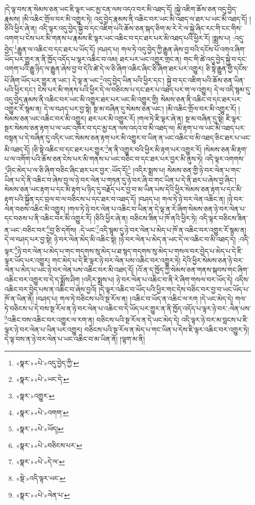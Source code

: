 །དེ་ལྟ་བས་ན་སེམས་ཅན་ཡང་ཇི་ལྟར་ཡང་མྱ་ངན་ལས་འདའ་བར་མི་འཐད་དོ། །སྐྱེ་འཇིག་ཆོས་ཅན་འདུ་བྱེད་རྣམས། །མི་འཆིང་གྲོལ་བར་མི་འགྱུར་ཏེ། འདུ་བྱེད་རྣམས་ནི་འཆིང་བར་ཡང་མི་འཐད་ལ་ཐར་པ་ཡང་མི་འཐད་དོ། །ཅིའི་ཕྱིར་ཞེ་ན། འདི་ལྟར་འདུ་བྱེད་སྐྱེ་བ་དང་འཇིག་པའི་ཆོས་ཅན་སྐད་ཅིག་མ་རེ་རེ་ལ་སྐྱེ་ཞིང་རང་གི་ངང་གིས་འགག་པ་ངེས་པར་མི་གནས་པ་རྣམས་ཇི་ལྟར་ཡང་འཆིང་བ་དང་ཐར་པར་མི་འཐད་པའི་ཕྱིར་རོ། །སྨྲས་པ། :འདུ་བྱེད་\footnote{«སྣར་»«པེ་»འདུ་བྱེད་ཀྱི་}རྒྱུན་ལ་འཆིང་བ་དང་ཐར་པ་ཡོད་དོ། །བཤད་པ། གལ་ཏེ་འདུ་བྱེད་ཀྱི་རྒྱུན་ཞེས་བྱ་བའི་དངོས་པོ་འགའ་ཞིག་ཡོད་པར་གྱུར་ན་ནི་ཁྱོད་འདོད་པ་ལྟར་འཆིང་བ་འམ། ཐར་པར་ཡང་འགྱུར་གྲང་ན། གང་གི་ཚེ་འདུ་བྱེད་སྐྱེ་བ་དང་འགག་པའི་རྒྱུ་ཉིད་ལ་རྒྱུན་ཞེས་བྱ་བ་དེའི་ཚེ་དེ་ལ་ཅི་ཞིག་འཆིང་ཞིང་ཅི་ཞིག་ཐར་པར་འགྱུར། ཅི་སྟེ་རྒྱུན་གྱི་དངོས་པོ་ཞིག་ཡོད་པར་གྱུར་ན་ཡང་། དེ་ལྟ་ན་ཡང་\footnote{«སྣར་»«པེ་»ཡང་དེ་}འདུ་བྱེད་ཡིན་པའི་ཕྱིར་དང་། སྐྱེ་བ་དང་འཇིག་པའི་ཆོས་ཅན་ཡིན་པའི་ཕྱིར་དང་། ངེས་པར་མི་གནས་པའི་ཕྱིར་དེ་ལ་བཅིངས་པ་དང་ཐར་པ་འཐད་པར་ག་ལ་འགྱུར། དེ་ལ་འདི་སྙམ་དུ་འདུ་བྱེད་རྣམས་ནི་འཆིང་བར་ཡང་མི་འགྱུར་ཐར་པར་ཡང་མི་འགྱུར་གྱི། སེམས་ཅན་ནི་འཆིང་བ་དང་ཐར་པར་འགྱུར་རོ་སྙམ་ན། དེ་ལ་བཤད་པར་བྱ་སྟེ། སྔ་མ་བཞིན་དུ་སེམས་ཅན་ཡང་། །མི་འཆིང་གྲོལ་བར་མི་འགྱུར་རོ། །སེམས་ཅན་ཡང་འཆིང་བར་མི་འགྱུར། ཐར་པར་མི་འགྱུར་རོ། །གལ་ཏེ་ཇི་ལྟར་ཞེ་ན། སྔ་མ་བཞིན་དུ་སྟེ། ཇི་ལྟར་སྔར་སེམས་ཅན་རྟག་པ་ལ་ཡང་འཁོར་བ་དང་མྱ་ངན་ལས་འདའ་བ་མི་འཐད་ལ། མི་རྟག་པ་ལ་ཡང་མི་འཐད་པར་བསྟན་པ་དེ་བཞིན་དུ་འདིར་ཡང་སེམས་ཅན་རྟག་པར་མི་འགྱུར་བ་ཡིན་ན་ཡང་འཆིང་བ་མི་འཐད་ཅིང་ཐར་པ་ཡང་མི་འཐད་དོ། །ཅི་སྟེ་འཆིང་བ་དང་ཐར་པར་གྱུར་\footnote{«སྣར་»འགྱུར་}ན་ནི་འགྱུར་བའི་ཕྱིར་མི་རྟག་པར་འགྱུར་རོ། །སེམས་ཅན་མི་རྟག་པ་ལ་འགོག་པའི་ཆོས་ཅན་ངེས་པར་མི་གནས་པ་ཡང་བཅིང་བ་དང་ཐར་པར་བྱར་མི་ནུས་ཏེ། འདི་ལྟར་འགགས་\footnote{«སྣར་»«པེ་»འགག་}ཤིང་མེད་པ་ལ་ཅི་ཞིག་བཅིང་ཞིང་ཐར་པར་བྱར་:ཡོད་དོ།\footnote{«སྣར་»«པེ་»ཡོད།} །འདིར་སྨྲས་པ། སེམས་ཅན་གྱི་ཉེ་བར་ལེན་པ་གང་ཡིན་པ་དེ་ནི་འཆིང་བ་ཞེས་བྱ་ལ་ཉེ་བར་ལེན་པ་གཏན་དུ་ཉེ་བར་ཞི་བ་གང་ཡིན་པ་དེ་ནི་ཐར་པ་ཞེས་བྱ་ཞིང་། སེམས་ཅན་ཡང་རྟག་པ་དང་མི་རྟག་པ་ཉིད་དུ་བརྗོད་པར་བྱ་བ་མ་ཡིན་པས་དེའི་ཕྱིར་སེམས་ཅན་རྟག་པ་དང་མི་རྟག་པའི་སྐྱོན་དང་བྲལ་བ་ལ་བཅིངས་པ་དང་ཐར་བ་འཐད་དོ། །བཤད་པ། གལ་ཏེ་ཉེ་བར་ལེན་འཆིང་ན། །ཉེ་བར་ལེན་བཅས་འཆིང་མི་འགྱུར། །གལ་ཏེ་ཉེ་བར་ལེན་པ་འཆིང་བ་ཡིན་ན་དེ་ལྟ་ན་རེ་ཞིག་སེམས་ཅན་ཉེ་བར་ལེན་པ་དང་བཅས་པ་ནི་འཆིང་བར་མི་འགྱུར་རོ། །ཅིའི་ཕྱིར་ཞེ་ན། བཅིངས་ཟིན་པ་ཁོ་ནའི་ཕྱིར་ཏེ། འདི་ལྟར་བཅིངས་ཟིན་ན་ཡང་:བཅིང་བར་\footnote{«སྣར་»«པེ་»བཅིངས་པར་}བྱ་ཅི་དགོས། :དེ་ཡང་\footnote{«སྣར་»«པེ་»དེ་ལ་}འདི་སྙམ་དུ་ཉེ་བར་ལེན་པ་མེད་པ་ཁོ་ན་འཆིང་བར་འགྱུར་རོ་སྙམ་ན། དེ་ལ་བཤད་པར་བྱ་སྟེ། ཉེ་བར་ལེན་མེད་མི་འཆིང་སྟེ། །ཉེ་བར་ལེན་པ་མེད་ན་ཡང་དེ་ལ་འཆིང་བ་མི་འཐད་དེ། :འདི་ལྟར་\footnote{«སྡེ་»འདི་ལྟར་ཡང་}ཉེ་བར་ལེན་པ་མེད་པ་གང་གདགས་སུ་མེད་པ་ཐ་སྙད་གདགས་སུ་མེད་པ་གསལ་བར་བྱེད་པ་མེད་པ་དེ་ཇི་ལྟར་ཡོད་པར་འགྱུར། གང་མེད་པ་དེ་ཇི་ལྟར་ཉེ་བར་ལེན་པས་འཆིང་བར་འགྱུར་ཏེ། དེའི་ཕྱིར་སེམས་ཅན་ཉེ་བར་ལེན་པ་མེད་པ་ཡང་ཉེ་བར་ལེན་པས་འཆིང་བར་མི་འཐད་དོ། །འོ་ན་ད་ཁྱོད་ཀྱི་སེམས་ཅན་གནས་སྐབས་གང་ཞིག་འཆིང་བར་འགྱུར་བ་དེ་ད་སྨྲོས་ཤིག །འདིར་སྨྲས་པ། ཉེ་བར་ལེན་པ་འཆིང་བ་ནི་རེ་ཞིག་གསལ་བར་ཡོད་དེ། འདིས་འཆིང་བར་བྱེད་པས་ན་འཆིང་བ་ཞེས་བྱའོ། །དེ་ལྟར་འཆིང་བ་ཡོད་པའི་ཕྱིར་གང་དེས་བཅིང་བར་བྱ་བ་ཡང་ཡོད་པ་ཁོ་ན་ཡིན་ནོ། །བཤད་པ། གལ་ཏེ་བཅིངས་པའི་སྔ་རོལ་ན། །འཆིང་བ་ཡོད་ན་འཆིང་ལ་རག །དེ་ཡང་མེད་དེ། གལ་ཏེ་བཅིངས་པ་དེ་བས་སྔ་རོལ་ན་ཉེ་བར་ལེན་པ་འཆིང་བ་དེ་ཡོད་པར་གྱུར་ན་ནི་ཁྱོད་འདོད་པ་ལྟར་ཉེ་བར་:ལེན་པས་\footnote{«སྣར་»«པེ་»ལེན་པ་}འཆིང་བས་འཆིང་བར་འགྱུར་ལ་རག་ན། བཅིངས་པའི་སྔ་རོལ་ན་དེ་ཡང་མེད་དེ། འདི་ལྟར་ཉེ་བར་མ་བླངས་པ་ཇི་ལྟར་ཉེ་བར་ལེན་པ་ཡིན་པར་འགྱུར། བཅིངས་པའི་སྔ་རོལ་ན་མེད་པ་གང་ཡིན་པ་དེས་ཇི་ལྟར་འཆིང་བར་འགྱུར་ཏེ། དེ་ལྟ་བས་ན་ཉེ་བར་ལེན་པ་ཡང་འཆིང་བ་མ་ཡིན་ནོ། །ལྷག་མ་ནི། 